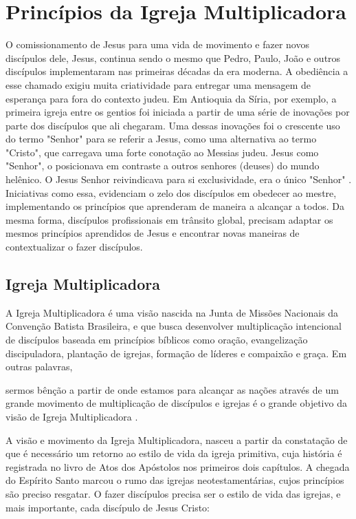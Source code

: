 \documentclass[12pt,openright,oneside,a4paper]{abntex2}
\begin{document}
\chapter{Princípios da Igreja Multiplicadora}
O comissionamento de Jesus para uma vida de movimento e fazer novos discípulos dele, Jesus, continua sendo o mesmo que Pedro, Paulo, João e outros discípulos implementaram nas primeiras décadas da era moderna. A obediência a esse chamado exigiu muita criatividade para entregar uma mensagem de esperança para fora do contexto judeu. Em Antioquia da Síria, por exemplo, a primeira igreja entre os gentios foi iniciada a partir de uma série de inovações por parte dos discípulos que ali chegaram. Uma dessas inovações foi o crescente uso do termo "Senhor" para se referir a Jesus, como uma alternativa ao termo "Cristo", que carregava uma forte conotação ao Messias judeu. Jesus como "Senhor", o posicionava em contraste a outros senhores (deuses) do mundo helênico. O Jesus Senhor reivindicava para si exclusividade, era o único "Senhor" \cite[p. 170]{green}. Iniciativas como essa, evidenciam o zelo dos discípulos em obedecer ao mestre, implementando os princípios que aprenderam de maneira a alcançar a todos. Da mesma forma, discípulos profissionais em trânsito global, precisam adaptar os mesmos princípios aprendidos de Jesus e encontrar novas maneiras de contextualizar o fazer discípulos.

\section{Igreja Multiplicadora}

A Igreja Multiplicadora é uma visão nascida na Junta de Missões Nacionais da Convenção Batista Brasileira, e que busca desenvolver multiplicação intencional de discípulos baseada em princípios bíblicos como oração, evangelização discipuladora, plantação de igrejas, formação de líderes e compaixão e graça. Em outras palavras, 

\begin{citacao}sermos bênção a partir de onde estamos para alcançar as nações através de um grande movimento de multiplicação de discípulos e igrejas é o grande objetivo da visão de Igreja Multiplicadora \cite[p. 19]{freitas}.\end{citacao}

A visão e movimento da Igreja Multiplicadora, nasceu a partir da constatação de que é necessário um retorno ao estilo de vida da igreja primitiva, cuja história é registrada no livro de Atos dos Apóstolos nos primeiros dois capítulos. A chegada do Espírito Santo marcou o rumo das igrejas neotestamentárias, cujos princípios são preciso resgatar. O fazer discípulos precisa ser o estilo de vida das igrejas, e mais importante, cada discípulo de Jesus Cristo: 
\end{document}
